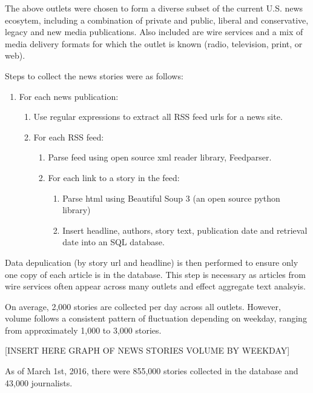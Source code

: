 The above outlets were chosen to form a diverse subset of the current U.S. news ecosytem, including a combination of private and public, liberal and conservative, legacy and new media publications. Also included are wire services and a mix of media delivery formats for which the outlet is known (radio, television, print, or web).

Steps to collect the news stories were as follows:

 \begin{enumerate}
   \item For each news publication:
   \begin {enumerate}
        \item Use regular expressions to extract all RSS feed urls for a news site.
        \item For each RSS feed:
        \begin {enumerate}
            \item Parse feed using open source xml reader library, Feedparser.
            \item For each link to a story in the feed:             
            \begin {enumerate}
                \item Parse html using Beautiful Soup 3 (an open source python library)
                \item Insert headline, authors, story text, publication date and retrieval date into an SQL database.

            \end {enumerate}
        \end{enumerate}
    \end{enumerate}
\end{enumerate}

Data depulication (by story url and headline) is then performed to ensure only one copy of each article is in the database. This step is necessary as articles from wire services often appear across many outlets and effect aggregate text analsyis.

On average, 2,000 stories are collected per day across all outlets. However, volume follows a consistent pattern of fluctuation depending on weekday, ranging from approximately 1,000 to 3,000 stories.

[INSERT HERE GRAPH OF NEWS STORIES VOLUME BY WEEKDAY]

As of March 1st, 2016, there were 855,000 stories collected in the database and 43,000 journalists.



